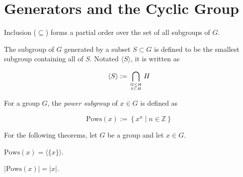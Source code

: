 \section{Generators and the Cyclic Group}

\begin{theorem}
    \label{theorem : subgroupOrder}
    \leanok
    Inclusion ($\subseteq$) forms a partial order over the set of all subgroups of $G$.
\end{theorem}

\begin{definition}
    \label{definition : Generate}
    \leanok
    The subgroup of $G$ generated by a subset $S \subset G$ is defined to be the smallest subgroup containing all of $S$. Notated $\langle S \rangle$, it is written as

    \begin{equation*}
        \langle S \rangle := \bigcap_{\genfrac{}{}{0pt}{}{G \le H}{S \subset H}} H
    \end{equation*}
\end{definition}

\begin{definition}
    \label{definition : Pows}
    \leanok
    For a group $G$, the \textit{power subgroup} of $x \in G$ is defined as

    $$\text{Pows}(x) := \left\{ x^n \middle| n \in \mathbb{Z} \right\}$$
\end{definition}

For the following theorems, let $G$ be a group and let $x \in G$.

\begin{theorem}
    \label{theorem : Pows_eq_Generate_singleton}
    \leanok
    $\text{Pows}(x) = \langle \{x\} \rangle$.
\end{theorem}

\begin{theorem}
    \label{theorem : Pows_card_eq_order}
    \leanok
    $|\text{Pows}(x)| = |x|$.
\end{theorem}
